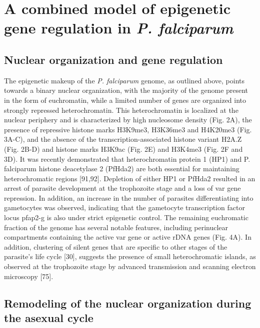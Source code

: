\section{A combined model of epigenetic gene regulation in \textit{P.
falciparum}}

\subsection{Nuclear organization and gene regulation}

The epigenetic makeup of the \textit{P. falciparum} genome, as outlined above, points
towards a binary nuclear organization, with the majority of the genome present
in the form of euchromatin, while a limited number of genes are organized into
strongly repressed heterochromatin. This heterochromatin is localized at the
nuclear periphery and is characterized by high nucleosome density (Fig. 2A),
the presence of repressive histone marks H3K9me3, H3K36me3 and H4K20me3 (Fig.
3A-C), and the absence of the transcription-associated histone variant H2A.Z
(Fig. 2B-D) and histone marks H3K9ac (Fig. 2E) and H3K4me3 (Fig. 2F and 3D).
It was recently demonstrated that heterochromatin protein 1 (HP1) and P.
falciparum histone deacetylase 2 (PfHda2) are both essential for maintaining
heterochromatic regions [91,92]. Depletion of either HP1 or PfHda2 resulted in
an arrest of parasite development at the trophozoite stage and a loss of var
gene repression. In addition, an increase in the number of parasites
differentiating into gametocytes was observed, indicating that the gametocyte
transcription factor locus pfap2-g is also under strict epigenetic control.
The remaining euchromatic fraction of the genome has several notable features,
including perinuclear compartments containing the active var gene or active
rDNA genes (Fig. 4A). In addition, clustering of silent genes that are
specific to other stages of the parasite’s life cycle [30], suggests the
presence of small heterochromatic islands, as observed at the trophozoite
stage by advanced transmission and scanning electron microscopy [75].

\subsection{Remodeling of the nuclear organization during the asexual cycle}

